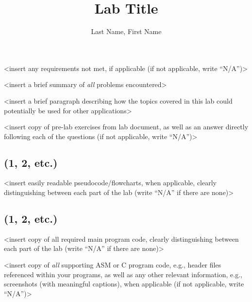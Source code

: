 \documentclass{3744lab}
\author{Last Name, First Name}
\title{\textcolor{wordpurple}{Lab Title}}
\begin{document}
  \begin{notmet}
    \noindent <insert any requirements not met, if applicable (if not applicable, write “N/A”)>
  \end{notmet}
  \begin{problems}
    \noindent <insert a brief summary of \textit{all} problems encountered>
  \end{problems}
  \begin{future}
    \noindent <insert a brief paragraph describing how the topics covered in this lab could potentially be used for other \linebreak applications>
  \end{future}
  \begin{prelab}
    \noindent <insert copy of pre-lab exercises from lab document, as well as an answer directly following each of the \linebreak questions (if not applicable, write “N/A”)>
  \end{prelab}
  \begin{codecharts}
    \subsection{(1, 2, etc.)}
    \noindent <insert easily readable pseudocode/flowcharts, when applicable, clearly distinguishing between each part of the lab (write “N/A” if there are none)>
  \end{codecharts}
  \begin{programcode}
    \subsection{(1, 2, etc.)}
    \noindent <insert copy of all required main program code, clearly distinguishing between each part of the lab (write “N/A” if there are none)> 
  \end{programcode}
  \begin{appendix}
    \noindent <insert copy of \textit{all} supporting ASM or C program code, e.g., header files referenced within your programs, as \linebreak well as any other relevant information, e.g., screenshots (with meaningful captions), when applicable (if not applicable, write “N/A”)>  
  \end{appendix}
\end{document}
